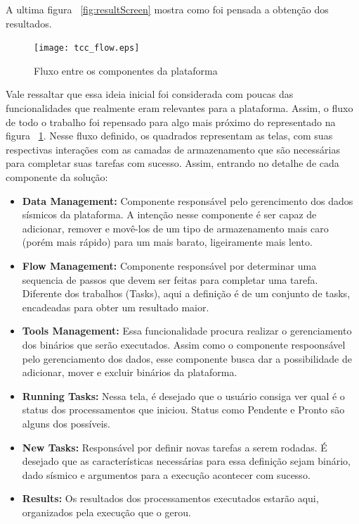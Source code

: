 \documentclass[11pt,twoside]{article}
\begin{document}
A ultima figura ~\ref{fig:resultScreen} mostra como foi pensada a obtenção dos resultados.

\begin{figure}[h!]
  \centering
  \texttt{[image: tcc\_flow.eps]}
  \caption{Fluxo entre os componentes da plataforma}
  \label{fig:flowScreen}
\end{figure}

Vale ressaltar que essa ideia inicial foi considerada com poucas das funcionalidades que realmente eram relevantes para a plataforma. Assim, o fluxo de todo o trabalho foi 
repensado para algo mais próximo do representado na figura ~\ref{fig:flowScreen}. Nesse fluxo definido, os quadrados representam as telas, com suas respectivas interações com 
as camadas de armazenamento que são necessárias para completar suas tarefas com sucesso. Assim, entrando no detalhe de cada componente da solução:

\begin{itemize}
  \item \textbf{Data Management:} Componente responsável pelo gerencimento dos dados sísmicos da plataforma. A intenção nesse componente é ser capaz de adicionar, remover e 
  movê-los de um tipo de armazenamento mais caro (porém mais rápido) para um mais barato, ligeiramente mais lento. 
  \item \textbf{Flow Management:} Componente responsável por determinar uma sequencia de passos que devem ser feitas para completar uma tarefa. Diferente dos trabalhos (Tasks),
  aqui a definição é de um conjunto de tasks, encadeadas para obter um resultado maior.
  \item \textbf{Tools Management:} Essa funcionalidade procura realizar o gerenciamento dos binários que serão executados. Assim como o componente respoonsável pelo gerenciamento
  dos dados, esse componente busca dar a possibilidade de adicionar, mover e excluir binários da plataforma.
  \item \textbf{Running Tasks:} Nessa tela, é desejado que o usuário consiga ver qual é o status dos processamentos que iniciou. Status como Pendente e Pronto são alguns dos 
  possíveis.
  \item \textbf{New Tasks:} Responsável por definir novas tarefas a serem rodadas. É desejado que as características necessárias para essa definição sejam binário, dado sísmico 
  e argumentos para a execução acontecer com sucesso. 
  \item \textbf{Results:} Os resultados dos processamentos executados estarão aqui, organizados pela execução que o gerou.
\end{itemize}
\end{document}
